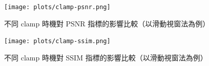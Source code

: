 \documentclass[a4paper,  10pt, oneside, fleqn]{article}
\begin{document}
\begin{figure}[h]
    \centering
    \texttt{[image: plots/clamp-psnr.png]}
    \caption{不同 clamp 時機對 PSNR 指標的影響比較（以滑動視窗法為例）}
    \label{fig:compare-clamp-psnr}
\end{figure}

\begin{figure}[h]
    \centering
    \texttt{[image: plots/clamp-ssim.png]}
    \caption{不同 clamp 時機對 SSIM 指標的影響比較（以滑動視窗法為例）}
    \label{fig:compare-clamp-ssim}
\end{figure}

\begin{figure}[h]
    \centering
    \hspace{0.25cm}
    \hspace{0.25cm}
    \hspace{0.25cm}

\end{figure}
\end{document}
